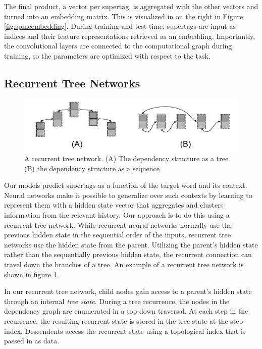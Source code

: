\documentclass[11pt]{article}
\begin{document}
The final product, a vector per supertag, is aggregated with the other vectors
and turned into an embedding matrix.
%
This is visualized in on the right in Figure \ref{fig:spineembedding}.
%
During training and test time, supertags are input as indices and their feature
representations retrieved as an embedding.
%
Importantly, the convolutional layers are connected to the computational graph during training, so the parameters are optimized with respect to the task.


\subsection{Recurrent Tree Networks}
\label{subsec:rtn}

\begin{figure}[tH!]
\centering
\includegraphics[width=\textwidth]{rtn.pdf}
\caption{A recurrent tree network. (A) The dependency structure as a tree.  (B) the dependency structure as a sequence.}
 \label{fig:rtn}
\end{figure}

Our models predict supertags as a function of the target word and its
context.  Neural networks make it possible to generalize over such
contexts by learning to represent them with a hidden state vector that
aggregates and clusters information from the relevant history.  Our
approach is to do this using a recurrent tree network.
%
While recurrent neural networks normally use the previous hidden state in the sequential order of the inputs,
recurrent tree networks use the hidden state from the parent.
%
Utilizing the parent's hidden state rather than the sequentially previous hidden
state, the recurrent connection can travel down the branches of a tree.
%
An example of a recurrent tree network is shown in figure \ref{fig:rtn}.



In our recurrent tree network, child nodes gain access to a parent's hidden state
through an internal \emph{tree state}.
%
During a tree recurrence, the nodes in the dependency graph are enumerated in a
top-down traversal.
%
At each step in the recurrence, the resulting recurrent state is stored in the
tree state at the step index.
%
Descendents access the recurrent state using a topological index that is passed in as data.
\end{document}
